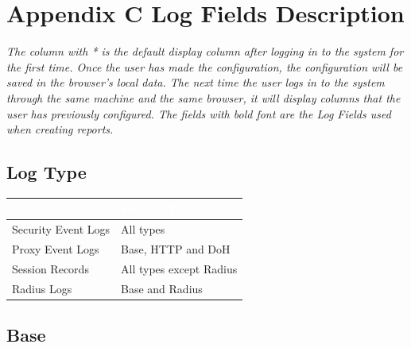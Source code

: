 %
\chapter*{\hypertarget{link:Appendix C Log Fields Description}{Appendix C Log Fields Description}}
\label{sec:appendix_c}

\notemark\textit{The column with * is the default display column after logging in to the system for the first time. Once the user has made the configuration, 
the configuration will be saved in the browser's local data. The next time the user logs in to the system through the same machine and the same browser, 
it will display columns that the user has previously configured. The fields with bold font are the Log Fields used when creating reports.}

\section*{\hypertarget{link:Log Type}{Log Type}}
\label{sec:appendix_c:logtype}

\begin{longtable}{p{}|p{}}   
    \rowcolor{black}\multicolumn{1}{l!\vlinewhite}{\textcolor{white}{Log Type}}  & \textcolor{white}{Schema Type} \\\hline  
    Security Event Logs &	All types \\\hline 
    Proxy Event Logs &	Base, HTTP and DoH \\\hline 
    Session Records &	All types except Radius \\\hline 
    Radius Logs &	Base and Radius \\\hline 
\end{longtable}

\section*{\hypertarget{link:Base}{Base}}
\label{sec:appendix_c:base}

